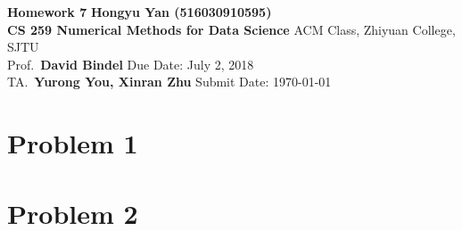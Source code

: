\documentclass[a4paper, 11pt]{article}
\begin{document}
\noindent
\large\textbf{Homework 7} \hfill \textbf{Hongyu Yan (516030910595)} \\
\normalsize {\bf CS 259 Numerical Methods for Data Science} \hfill ACM Class, Zhiyuan College, SJTU\\
Prof.~{\bf David Bindel} \hfill Due Date: July 2, 2018\\
TA.~{\bf Yurong You, Xinran Zhu} \hfill Submit Date: \today

\section*{Problem 1}

\section*{Problem 2}
\end{document}

